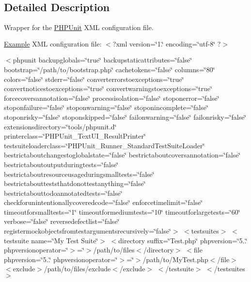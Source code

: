 \subsection{Detailed Description}
Wrapper for the \mbox{\hyperlink{namespace_p_h_p_unit}{P\+H\+P\+Unit}} X\+ML configuration file.

\mbox{\hyperlink{class_example}{Example}} X\+ML configuration file\+: {\ttfamily  $<$?xml version=\char`\"{}1.\char`\"{} encoding=\char`\"{}utf-\/8\char`\"{} ?$>$}

{\ttfamily $<$phpunit backupglobals=\char`\"{}true\char`\"{} backupstaticattributes=\char`\"{}false\char`\"{} bootstrap=\char`\"{}/path/to/bootstrap.\+php\char`\"{} cachetokens=\char`\"{}false\char`\"{} columns=\char`\"{}80\char`\"{} colors=\char`\"{}false\char`\"{} stderr=\char`\"{}false\char`\"{} converterrorstoexceptions=\char`\"{}true\char`\"{} convertnoticestoexceptions=\char`\"{}true\char`\"{} convertwarningstoexceptions=\char`\"{}true\char`\"{} forcecoversannotation=\char`\"{}false\char`\"{} processisolation=\char`\"{}false\char`\"{} stoponerror=\char`\"{}false\char`\"{} stoponfailure=\char`\"{}false\char`\"{} stoponwarning=\char`\"{}false\char`\"{} stoponincomplete=\char`\"{}false\char`\"{} stoponrisky=\char`\"{}false\char`\"{} stoponskipped=\char`\"{}false\char`\"{} failonwarning=\char`\"{}false\char`\"{} failonrisky=\char`\"{}false\char`\"{} extensionsdirectory=\char`\"{}tools/phpunit.\+d\char`\"{} printerclass=\char`\"{}\+P\+H\+P\+Unit\+\_\+\+Text\+U\+I\+\_\+\+Result\+Printer\char`\"{} testsuiteloaderclass=\char`\"{}\+P\+H\+P\+Unit\+\_\+\+Runner\+\_\+\+Standard\+Test\+Suite\+Loader\char`\"{} bestrictaboutchangestoglobalstate=\char`\"{}false\char`\"{} bestrictaboutcoversannotation=\char`\"{}false\char`\"{} bestrictaboutoutputduringtests=\char`\"{}false\char`\"{} bestrictaboutresourceusageduringsmalltests=\char`\"{}false\char`\"{} bestrictaboutteststhatdonottestanything=\char`\"{}false\char`\"{} bestrictabouttodoannotatedtests=\char`\"{}false\char`\"{} checkforunintentionallycoveredcode=\char`\"{}false\char`\"{} enforcetimelimit=\char`\"{}false\char`\"{} timeoutforsmalltests=\char`\"{}1\char`\"{} timeoutformediumtests=\char`\"{}10\char`\"{} timeoutforlargetests=\char`\"{}60\char`\"{} verbose=\char`\"{}false\char`\"{} reversedefectlist=\char`\"{}false\char`\"{} registermockobjectsfromtestargumentsrecursively=\char`\"{}false\char`\"{}$>$ $<$testsuites$>$ $<$testsuite name=\char`\"{}\+My Test Suite\char`\"{}$>$ $<$directory suffix=\char`\"{}\+Test.\+php\char`\"{} phpversion=\char`\"{}5..\char`\"{} phpversionoperator=\char`\"{}$>$=\char`\"{}$>$/path/to/files$<$/directory$>$ $<$file phpversion=\char`\"{}5..\char`\"{} phpversionoperator=\char`\"{}$>$=\char`\"{}$>$/path/to/\+My\+Test.php$<$/file$>$ $<$exclude$>$/path/to/files/exclude$<$/exclude$>$ $<$/testsuite$>$ $<$/testsuites$>$}

